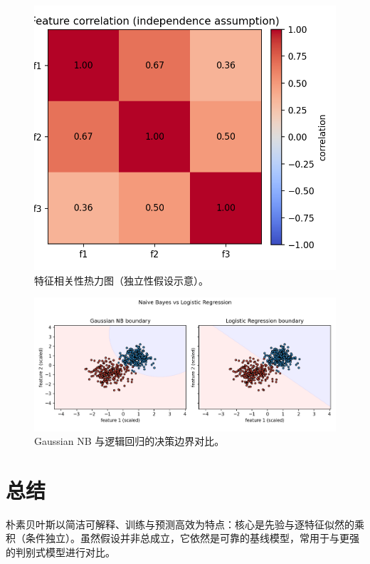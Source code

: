 \documentclass[UTF8,zihao=-4]{ctexart}
\begin{document}
\begin{figure}[H]
  \centering
  \includegraphics[width=0.9\linewidth]{feature_independence_heatmap.png}
  \caption{特征相关性热力图（独立性假设示意）。}
  \label{fig:heatmap_cn}
\end{figure}
\FloatBarrier

\begin{figure}[H]
  \centering
  \includegraphics[width=0.95\linewidth]{gnb_vs_logreg_boundary.png}
  \caption{Gaussian NB 与逻辑回归的决策边界对比。}
  \label{fig:nb_vs_lr_cn}
\end{figure}
\FloatBarrier

\section{总结}
朴素贝叶斯以简洁可解释、训练与预测高效为特点：核心是先验与逐特征似然的乘积（条件独立）。虽然假设并非总成立，它依然是可靠的基线模型，常用于与更强的判别式模型进行对比。
\end{document}
